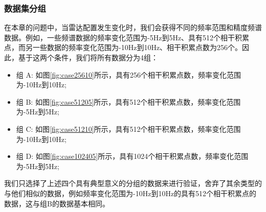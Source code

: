 \subsubsection{数据集分组}
在本章的问题中，当雷达配置发生变化时，我们会获得不同的频率范围和精度频谱数据。例如，一些频谱数据的频率变化范围为-5Hz到5Hz、具有512个相干积累点，而另一些数据的频率变化范围为-10Hz到10Hz、相干积累点数为256个。因此，基于这两个条件，我们将所有数据分为4组：
\begin{itemize}
	\item 组 A: 如图\ref{fig:case25610}所示，具有256个相干积累点数，频率变化范围为-10Hz到10Hz;
	\item 组 B: 如图\ref{fig:case51205}所示，具有512个相干积累点数，频率变化范围为-5Hz到5Hz;
	\item 组 C: 如图\ref{fig:case51210}所示，具有512个相干积累点数，频率变化范围为-10Hz到10Hz;
	\item 组 D: 如图\ref{fig:case102405}所示，具有1024个相干积累点数，频率变化范围为-5Hz到5Hz;
\end{itemize}
我们只选择了上述四个具有典型意义的分组的数据来进行验证，舍弃了其余类型的与他们相似的数据，例如频率变化范围为-10Hz到10Hz的具有512个相干积累点的数据，这与组B的数据基本相同。
